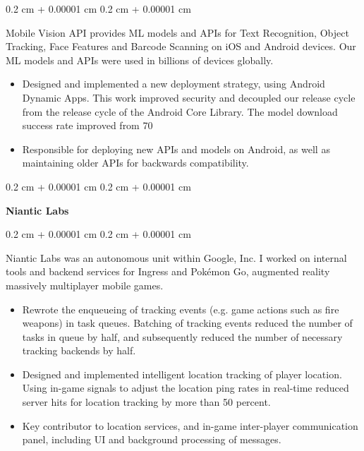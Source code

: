 \documentclass[12pt, letterpaper]{article}
\newenvironment{highlights}{
    \begin{itemize}[
        topsep=0.10 cm,
        parsep=0.10 cm,
        partopsep=0pt,
        itemsep=0pt,
        leftmargin=0.4 cm + 10pt
    ]
}{
    \end{itemize}
} %
\newenvironment{onecolentry}{
    \begin{adjustwidth}{
        0.2 cm + 0.00001 cm
    }{
        0.2 cm + 0.00001 cm
    }
}{
    \end{adjustwidth}
} %
\begin{document}
        \begin{onecolentry}
            Mobile Vision API provides ML models and APIs for Text Recognition, Object Tracking, Face Features and Barcode Scanning on iOS and Android devices.  Our ML models and APIs were used in billions of devices globally.
            \begin{highlights}
                \item Designed and implemented a new deployment strategy, using Android Dynamic Apps. This work improved security and decoupled our release cycle from the release cycle of the Android Core Library.  The model download success rate improved from 70%
                \item Responsible for deploying new APIs and models on Android, as well as maintaining older APIs for backwards compatibility.
            \end{highlights}
        \end{onecolentry}
        
        \begin{onecolentry}
            \textbf{Niantic Labs}
        \end{onecolentry}

        \vspace{0.10 cm}
        \begin{onecolentry}
            Niantic Labs was an autonomous unit within Google, Inc.  I worked on internal tools and backend services for Ingress and Pokémon Go, augmented reality massively multiplayer mobile games.
            \begin{highlights}
                \item Rewrote the enqueueing of tracking events (e.g. game actions such as fire weapons) in task queues.  Batching of tracking events reduced the number of tasks in queue by half, and subsequently reduced the number of necessary tracking backends by half.
                \item Designed and implemented intelligent location tracking of player location.  Using in-game signals to adjust the location ping rates in real-time reduced server hits for location tracking by more than 50 percent.
                \item Key contributor to location services, and in-game inter-player communication panel, including UI and background processing of messages.
            \end{highlights}
        \end{onecolentry}
\end{document}
